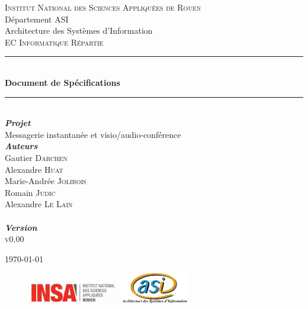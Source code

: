 \documentclass[11pt,dvipsnames,svgnames]{report}
\begin{document}
\begin{titlepage}
\newcommand{\HRule}{\rule{\linewidth}{0.5mm}}
\center
{}\textsc{\huge Institut National des Sciences Appliquées de Rouen}\\[0.7cm]
\LARGE Département ASI~\\[0.5cm]
\Large{Architecture des Systèmes d'Information} ~\\[1.5cm]
\textsc{\Large EC Informatique Répartie}\\[0.5cm]

\HRule \\[0.4cm]
{ \huge \bfseries Document de Spécifications}\\[0.18cm] \HRule \\[1.5cm]

\LARGE \emph{\textbf{Projet}} \\
{Messagerie instantanée et visio/audio-conférence}\\[1.3cm]

\large
	\emph{\textbf{Auteurs}}\\
	Gautier \textsc{Darchen} \\
	Alexandre \textsc{Huat} \\
	Marie-Andrée \textsc{Jolibois} \\
	Romain \textsc{Judic} \\
	Alexandre \textsc{Le Lain}\\[0.3cm]

~\\[0.5cm]
\Large \emph{\textbf{Version}}\\
	\textsc{v0.00}

\vfill{\today}

\begin{figure}
\includegraphics[width=4cm]{images/LogoINSA.png}\hfill
\includegraphics[width=3cm]{images/logoasi.png}
\end{figure}


 \end{titlepage}
\end{document}
